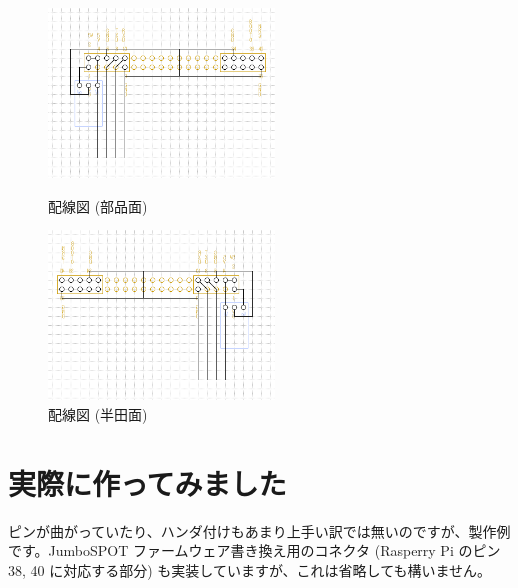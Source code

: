 \documentclass[a4j,oneside]{ujbook}
\begin{document}
\begin{figure}[H]
 \begin{minipage}[t]{0.5\hsize}
  \centering
  \includegraphics[width=6cm]{img/conn.png}
  \caption{配線図 (部品面)}
 \end{minipage}
 \begin{minipage}[t]{0.5\hsize}
  \centering
  \includegraphics[width=6cm]{img/conn_r.png}
  \caption{配線図 (半田面)}
 \end{minipage}
\end{figure}

\section{実際に作ってみました}

ピンが曲がっていたり、ハンダ付けもあまり上手い訳では無いのですが、製作例です。JumboSPOT ファームウェア書き換え用のコネクタ (Rasperry Pi のピン 38, 40 に対応する部分) も実装していますが、これは省略しても構いません。
\end{document}
